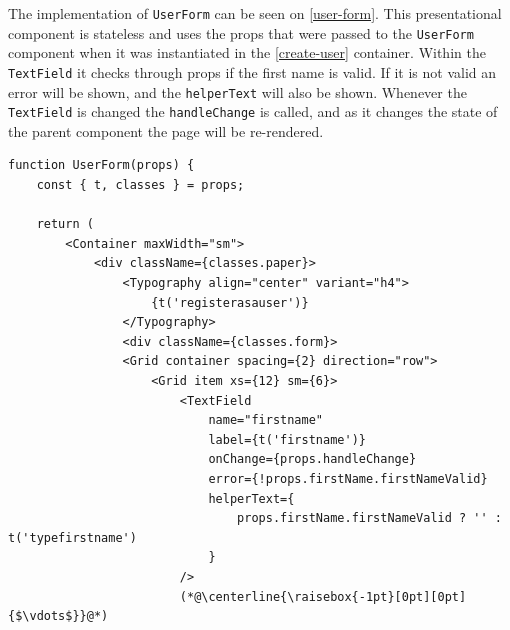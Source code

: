 The implementation of \texttt{UserForm} can be seen on \autoref{user-form}.
This presentational component is stateless and uses the props that were passed to the \texttt{UserForm} component when it was instantiated in the \autoref{create-user} container.
Within the \texttt{TextField} it checks through props if the first name is valid. 
If it is not valid an error will be shown, and the \texttt{helperText} will also be shown.
Whenever the \texttt{TextField} is changed the \texttt{handleChange} is called, and as it changes the state of the parent component the page will be re-rendered.

\begin{lstlisting}[caption={Presentational component for userform}, captionpos=b, label={user-form}]
function UserForm(props) {
    const { t, classes } = props;
    
    return (
        <Container maxWidth="sm">
            <div className={classes.paper}>
                <Typography align="center" variant="h4">
                    {t('registerasauser')}
                </Typography>
                <div className={classes.form}>
                <Grid container spacing={2} direction="row">
                    <Grid item xs={12} sm={6}>
                        <TextField
                            name="firstname"
                            label={t('firstname')}
                            onChange={props.handleChange}
                            error={!props.firstName.firstNameValid}
                            helperText={
                                props.firstName.firstNameValid ? '' : t('typefirstname')
                            }
                        />
                        (*@\centerline{\raisebox{-1pt}[0pt][0pt]{$\vdots$}}@*)
\end{lstlisting}

